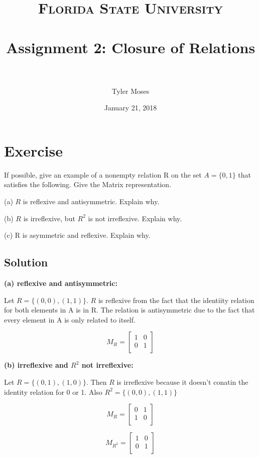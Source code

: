 \documentclass[paper=a4, fontsize=11pt]{scrartcl} %
\title{	
\normalfont \normalsize 
\textsc{Florida State University} \\ [25pt] %
\horrule{0.5pt} \\[0.4cm] %
\huge Assignment 2: Closure of Relations \\ %
\horrule{2pt} \\[0.5cm] %
}
\author{Tyler Moses} %
\date{\normalsize January 21, 2018} %
\numberwithin{equation}{section} %
\numberwithin{figure}{section} %
\numberwithin{table}{section} %
\begin{document}
\maketitle %


\section{Exercise}

If possible, give an example of a nonempty relation R on the set $A = \{0,1\}$ that satisfies the following. Give the Matrix representation.

(a) $R$ is reflexive and antisymmetric. Explain why.

(b) $R$ is irreflexive, but $R^2$ is not irreflexive. Explain why.

(c) R is asymmetric and reflexive. Explain why.

\subsection{Solution}

\textbf{(a) reflexive and antisymmetric:}

Let $R = \{(0,0), (1,1)\}$. $R$ is reflexive from the fact that the identiity relation for both elements in A is in R. The relation is antisymmetric due to the fact that every element in A is only related to itself.

$$M_R = \begin{bmatrix}
1 & 0  \\
0 & 1  \\
\end{bmatrix}$$

\textbf{(b) irreflexive and $R^2$ not  irreflexive:}

Let $R = \{(0,1),(1,0)\}$. Then $R$ is irreflexive because it doesn't conatin the identity relation for 0 or 1. Also $R^2 = \{(0,0),(1,1)\}$ 

$$M_R = \begin{bmatrix}
0 & 1  \\
1 & 0  \\
\end{bmatrix}$$

$$M_{R^2} = \begin{bmatrix}
1 & 0  \\
0 & 1  \\
\end{bmatrix}$$
\end{document}
